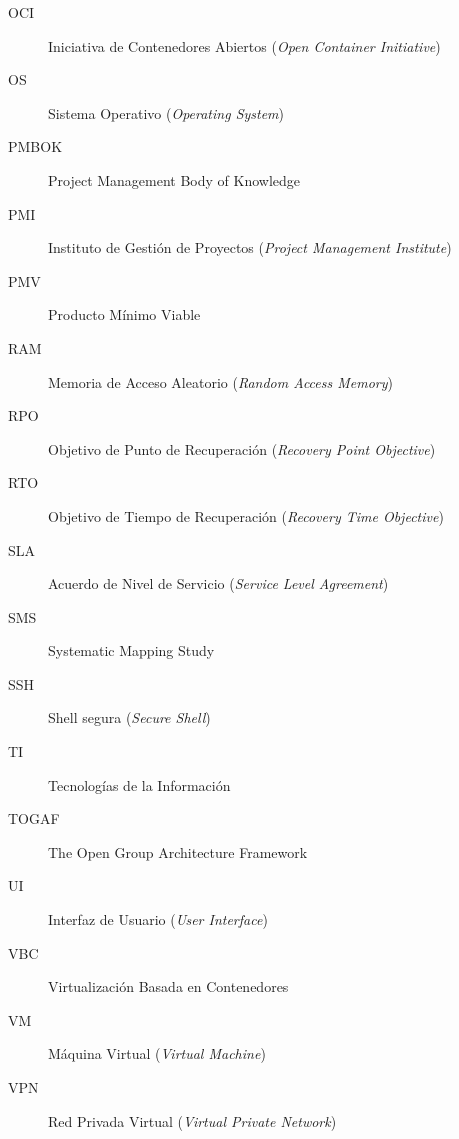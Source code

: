 \begin{description}
  \item[OCI] Iniciativa de Contenedores Abiertos (\textit{Open Container Initiative})
  \item[OS] Sistema Operativo (\textit{Operating System})
  \item[PMBOK] Project Management Body of Knowledge
  \item[PMI] Instituto de Gestión de Proyectos (\textit{Project Management Institute})
  \item[PMV] Producto Mínimo Viable
  \item[RAM] Memoria de Acceso Aleatorio (\textit{Random Access Memory})
  \item[RPO] Objetivo de Punto de Recuperación (\textit{Recovery Point Objective})
  \item[RTO] Objetivo de Tiempo de Recuperación (\textit{Recovery Time Objective})
  \item[SLA] Acuerdo de Nivel de Servicio (\textit{Service Level Agreement})
  \item[SMS] Systematic Mapping Study
  \item[SSH] Shell segura (\textit{Secure Shell})
  \item[TI] Tecnologías de la Información
  \item[TOGAF] The Open Group Architecture Framework
  \item[UI] Interfaz de Usuario (\textit{User Interface})
  \item[VBC] Virtualización Basada en Contenedores
  \item[VM] Máquina Virtual (\textit{Virtual Machine})
  \item[VPN] Red Privada Virtual (\textit{Virtual Private Network})
\end{description}